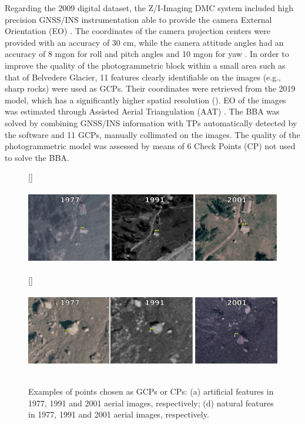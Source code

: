 Regarding the 2009 digital dataset, the Z/I-Imaging DMC system included high precision GNSS/INS instrumentation able to provide the camera External Orientation (EO) \citep{Hinz2001}. 
The coordinates of the camera projection centers were provided with an accuracy of 30 cm, while the camera attitude angles had an accuracy of 8 mgon for roll and pitch angles and 10 mgon for yaw \citep{Forlani_pinto2001}.
In order to improve the quality of the photogrammetric block within a small area such as that of Belvedere Glacier, 11 features clearly identifiable on the images (e.g., sharp rocks) were used as GCPs. 
Their coordinates were retrieved from the 2019 model, which has a significantly higher spatial resolution (). 
EO of the images was estimated through Assisted Aerial Triangulation (AAT) \citep{ioli2021_lowcost_dgps}. 
The BBA was solved by combining GNSS/INS information with TPs automatically detected by the software and 11 GCPs, manually collimated on the images. 
The quality of the photogrammetric model was assessed by means of 6 Check Points (CP) not used to solve the BBA. 

\begin{figure}
    \centering
    \subcaptionbox{\label{fig:2:gcp_examples:artificial}}[\textwidth]{
        \includegraphics[height=4cm]{artificial_gcps}
    } \\
    \subcaptionbox{\label{fig:2:gcp_examples:natural}}[\textwidth]{
        \includegraphics[height=4cm]{natural_gcps}
    }
    \caption{Examples of points chosen as GCPs or CPs: (a) artificial features in 1977, 1991 and 2001 aerial images, respectively; (d) natural features in 1977, 1991 and 2001 aerial images, respectively.}
    \label{fig:2:gcp_examples}
\end{figure}


